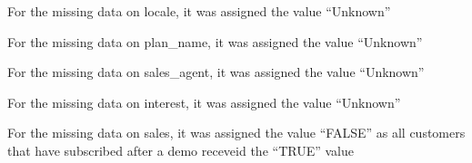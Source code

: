 \documentclass[]{article}
\newenvironment{Shaded}{\begin{snugshade}}{\end{snugshade}}
\newcommand{\KeywordTok}[1]{\textcolor[rgb]{0.13,0.29,0.53}{\textbf{#1}}}
\newcommand{\DataTypeTok}[1]{\textcolor[rgb]{0.13,0.29,0.53}{#1}}
\newcommand{\StringTok}[1]{\textcolor[rgb]{0.31,0.60,0.02}{#1}}
\newcommand{\OperatorTok}[1]{\textcolor[rgb]{0.81,0.36,0.00}{\textbf{#1}}}
\newcommand{\NormalTok}[1]{#1}
\begin{document}
For the missing data on locale, it was assigned the value ``Unknown''

\begin{Shaded}
\end{Shaded}

For the missing data on plan\_name, it was assigned the value
``Unknown''

\begin{Shaded}
\end{Shaded}

For the missing data on sales\_agent, it was assigned the value
``Unknown''

\begin{Shaded}
\end{Shaded}

For the missing data on interest, it was assigned the value ``Unknown''

\begin{Shaded}
\end{Shaded}

For the missing data on sales, it was assigned the value ``FALSE'' as
all customers that have subscribed after a demo receveid the ``TRUE''
value

\begin{Shaded}
\end{Shaded}
\end{document}
